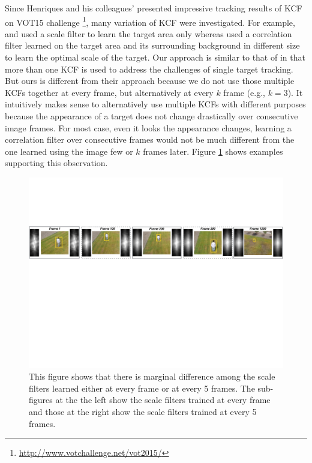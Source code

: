 \documentclass{bmvc2k}
\begin{document}
Since Henriques and his colleagues' presented impressive tracking
results of KCF \cite{henriques2015high} on VOT15
challenge \footnote{\url{http://www.votchallenge.net/vot2015/}}, many
variation of KCF were investigated. For example, \cite{ma2015long} and
\cite{danelljan2014accurate} used a scale filter to learn the target
area only whereas \cite{li2014scale, bibi2015multi, tang2015multi}
used a correlation filter learned on the target area and its
surrounding background in different size to learn the optimal scale of
the target. Our approach is similar to that of \cite{ma2015long} in
that more than one KCF is used to address the challenges of single
target tracking. But ours is different from their approach because we
do not use those multiple KCFs together at every frame, but
alternatively at every $k$ frame (e.g., $k=3$). It intuitively makes
sense to alternatively use multiple KCFs with different purposes
because the appearance of a target does not change drastically over
consecutive image frames. For most case, even it looks the appearance
changes, learning a correlation filter over consecutive frames would
not be much different from the one learned using the image few or $k$
frames later. Figure \ref{fig:Filters_Comparison} shows examples
supporting this observation.

\begin{figure}[!h]
\centering
\includegraphics[width=1\textwidth]{figures/LearnedFiltersComparison2.pdf}
\caption{This figure shows that there is marginal difference among the
  scale filters learned either at every frame or at every 5
  frames. The sub-figures at the the left show the scale filters
  trained at every frame and those at the right show the scale
  filters trained at every 5 frames.}
\label{fig:Filters_Comparison}
\end{figure}
\end{document}
